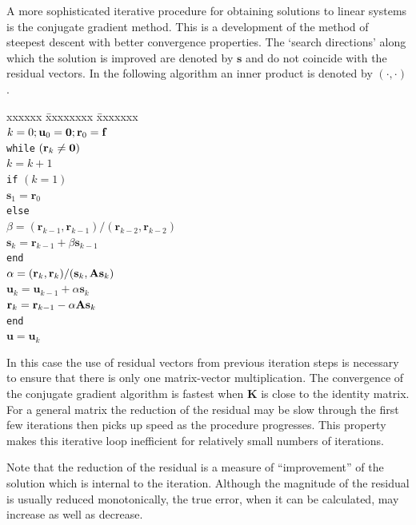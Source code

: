 \documentclass[10pt]{article}
\begin{document}
	A more sophisticated iterative procedure for obtaining solutions to linear systems 
	is the conjugate gradient method. This is a development of the method of steepest
	descent with better convergence properties. The `search directions' along which
	the solution is improved are denoted by $\mathbf{s}$ and do not coincide with the 
	residual vectors. In the following algorithm an inner product is denoted by $(\cdot,\cdot)$.
		\begin{tabbing}
			  xxxxxx \= xxxxxxxx \= xxxxxxx \kill  \\ 
			  $ k = 0; \mathbf{u}_0 = {\bf 0}; \mathbf{r}_0 = \mathbf{f}$ \\
			  {\tt while} $(\mathbf{r}_k \not= {\bf 0})$ \\
			  \> $ k = k + 1 $\\
			  \> {\tt if} $(k=1)$ \\
			  \> \>$ \mathbf{s}_1 = \mathbf{r}_0$\\
			  \> {\tt else} \\
			  \> \> $\beta = (\mathbf{r}_{k-1},\mathbf{r}_{k-1})/(\mathbf{r}_{k-2},\mathbf{r}_{k-2})$\\
			  \> \> $\mathbf{s}_k = \mathbf{r}_{k-1} + \beta \mathbf{s}_{k-1}$\\
			  \> {\tt end}\\
			  \> $\alpha = (\mathbf{r}_{k},\mathbf{r}_{k})/(\mathbf{s}_{k},{\bf A s}_{k})$\\
			  \> $\mathbf{u}_k = \mathbf{u}_{k-1} + \alpha \mathbf{s}_{k}$\\
			  \> $\mathbf{r}_k = \mathbf{r}_{k-1} - \alpha {\bf As}_{k}$\\
			  {\tt end}\\
			  $\mathbf{u} = \mathbf{u}_k$\\
		\end{tabbing}
		
	In this case the use of residual vectors from previous iteration steps is necessary to ensure
	that there is only one matrix-vector multiplication. The convergence of the conjugate
	gradient algorithm is fastest when $\mathbf{K}$ is close to the identity matrix. For a general
	matrix the reduction of the residual may be  slow through the first few iterations then
	picks up speed as the procedure progresses. This property makes this iterative loop inefficient
	for relatively small numbers of iterations.
	
	 Note that the reduction of the residual is a
	measure of ``improvement'' of the solution which is internal to the iteration. Although
	the magnitude of the residual is usually reduced monotonically, the true error, when it
	can be calculated, may increase as well as decrease. 
	
\end{document}
